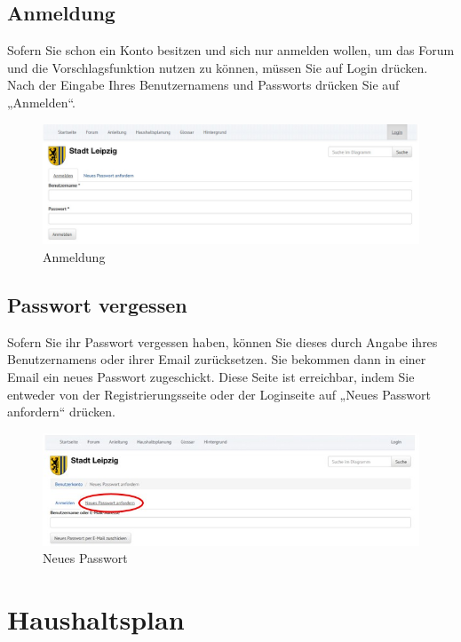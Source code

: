 \documentclass[a4paper,11pt,twoside]{article}
\begin{document}
\subsection{Anmeldung} \label{anmeldung}
Sofern Sie schon ein Konto besitzen und sich nur anmelden wollen, um das Forum
und die Vorschlagsfunktion nutzen zu k\"onnen, m\"ussen Sie auf Login
dr\"ucken.  Nach der Eingabe Ihres Benutzernamens und Passworts dr\"ucken Sie
auf „Anmelden“.
\begin{figure}[ht]
\begin{center}
  \includegraphics[width=.8\textwidth]{Bilder/anmelden.jpg}
\end{center}
  \caption{Anmeldung}
\end{figure}

\subsection{Passwort vergessen}
Sofern Sie ihr Passwort vergessen haben, k\"onnen Sie dieses durch Angabe
ihres Benutzernamens oder ihrer Email zur\"ucksetzen. Sie bekommen dann in
einer Email ein neues Passwort zugeschickt. Diese Seite ist erreichbar, indem
Sie entweder von der Registrierungsseite oder der Loginseite auf „Neues
Passwort anfordern“ dr\"ucken.
\begin{figure}[ht]
\begin{center}
  \includegraphics[width=.8\textwidth]{Bilder/neuesPasswort.jpg}
\end{center}
  \caption{Neues Passwort}
\end{figure}
\section{Haushaltsplan}
\end{document}
